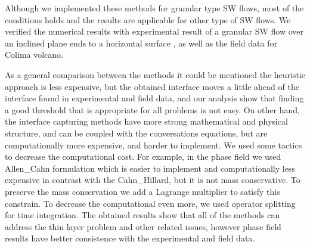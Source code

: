 \documentclass[letterpaper,10pt]{article}
\begin{document}


  Although we implemented these methods for granular type SW flows, most of the conditions holds and the results are applicable for other type of SW flows.  We verified the numerical results with experimental result of a granular SW flow over an inclined plane ends to a horizontal surface , as well as the field data for Colima volcano.



As a general comparison between the methods it could be mentioned the heuristic approach is less expensive, but the obtained interface moves a little ahead of the interface found in experimental and field data, and our analysis show that finding a good threshold that is appropriate for all problems is not easy. 
On other hand, the interface capturing methods have more strong mathematical and physical structure, and can be coupled with the conversations equations, but are computationally more expensive, and harder to implement. We used some tactics to decrease the computational cost. For example, in the phase field we used Allen\_Cahn formulation which is easier to implement and computationally less expensive in contrast with the Cahn\_Hillard, but it is not mass conservative. To preserve the mass conservation we add a Lagrange multiplier to satisfy this constrain. To decrease the computational even more, we used operator splitting for time integration. The obtained results show that all of the methods can address the thin layer problem and other related issues, however phase field results have better consistence with the experimental and field data. 
\end{document}

